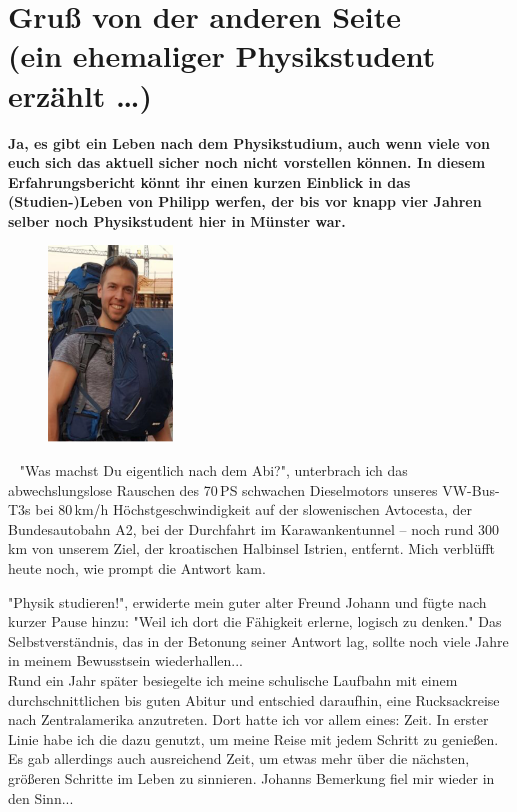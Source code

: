 \section[Gruß von der anderen Seite (ein ehemaliger Physikstudent erzählt \dots)]{Gruß von der anderen Seite\\(ein ehemaliger Physikstudent erzählt \dots)}
\textbf{
Ja, es gibt ein Leben nach dem Physikstudium, auch wenn viele von euch sich das aktuell sicher noch nicht vorstellen können.
In diesem Erfahrungsbericht könnt ihr einen kurzen Einblick in das (Studien-)Leben von Philipp werfen, der bis vor knapp vier Jahren selber noch Physikstudent hier in Münster war.
}


\begin{multicols}{2}

\begin{figure}
	\includegraphics[width=3.3cm]{res/philipp_van_wickevoort_crommelin.PNG}
\end{figure}
~
"Was machst Du eigentlich nach dem Abi?", unterbrach ich das abwechslungslose Rauschen des 70\,PS schwachen Dieselmotors unseres
VW-Bus-T3s bei 80\,km/h Höchstgeschwindigkeit auf der slowenischen Avtocesta, der Bundesautobahn A2, bei der Durchfahrt im
Karawankentunnel – noch rund 300\,km von unserem Ziel, der kroatischen Halbinsel Istrien, entfernt.
Mich verblüfft heute noch, wie prompt die Antwort kam.

"Physik studieren!", erwiderte mein guter alter Freund Johann und fügte nach kurzer Pause hinzu: "Weil ich dort die Fähigkeit erlerne, logisch zu denken."
Das Selbstverständnis, das in der Betonung seiner Antwort lag, sollte noch viele Jahre in meinem Bewusstsein wiederhallen... \\ 

Rund ein Jahr später besiegelte ich meine schulische Laufbahn mit einem durchschnittlichen bis guten Abitur und entschied daraufhin,
eine Rucksackreise nach Zentralamerika anzutreten.
Dort hatte ich vor allem eines: Zeit. In erster Linie habe ich die dazu genutzt, um meine Reise mit jedem Schritt zu genießen.
Es gab allerdings auch ausreichend Zeit, um etwas mehr über die nächsten, größeren Schritte im Leben zu sinnieren. Johanns Bemerkung fiel mir wieder in den Sinn... \\ 


\end{multicols}
